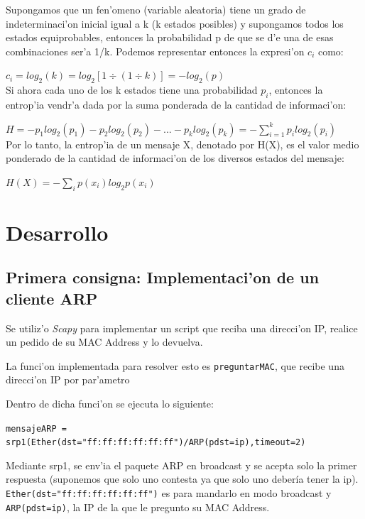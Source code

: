 \documentclass[a4paper,10pt]{article}
\begin{document}
Supongamos que un fen'omeno (variable aleatoria) tiene un grado de indeterminaci'on inicial igual a k (k estados posibles) y supongamos todos los estados equiprobables, entonces la probabilidad p de que se d'e una de esas combinaciones ser'a 1/k. Podemos representar entonces la expresi'on  $c_{i}$ como:

\vspace*{5 mm}
$c_{i} = log_{2}(k) = log_{2}\left[ 1 \div (1 \div k)\right] = -log_{2}(p)$
\\

Si ahora cada uno de los k estados tiene una probabilidad $p_{i}$, entonces la entrop'ia vendr'a dada por la suma ponderada de la cantidad de informaci'on:

\vspace*{5 mm}
$H = -p_{1}log_{2}(p_{1}) - p_{2}log_{2}(p_{2}) - ... -p_{k}log_{2}(p_{k}) = -\sum^{k}_{i=1} p_{i}log_{2}(p_{i})$
\\

Por lo tanto, la entrop'ia de un mensaje X, denotado por H(X), es el valor medio ponderado de la cantidad de informaci'on de los diversos estados del mensaje:

\vspace*{5 mm}
$H(X) = -\sum_{i} p(x_{i})log_{2}p(x_{i})$
\\

\section{Desarrollo}
\label{desarrollo1:}
\subsection{Primera consigna: Implementaci'on de un cliente ARP}
\label{expli1:}

Se utiliz'o \textit{Scapy} para implementar un script que reciba una direcci'on IP, realice un pedido de su MAC Address y lo devuelva.

La funci'on implementada para resolver esto es \texttt{preguntarMAC}, que recibe una direcci'on IP por par'ametro

Dentro de dicha funci'on se ejecuta lo siguiente:

\vspace*{5 mm}
\texttt{mensajeARP = srp1(Ether(dst="ff:ff:ff:ff:ff:ff")/ARP(pdst=ip),timeout=2)}
\vspace*{5 mm}

Mediante srp1, se env'ia el paquete ARP en broadcast y se acepta solo la primer respuesta (suponemos que solo uno contesta ya que solo uno debería tener la ip). \texttt{Ether(dst="ff:ff:ff:ff:ff:ff")} es para mandarlo en modo broadcast y \texttt{ARP(pdst=ip)}, la IP de la que le pregunto su MAC Address.
\end{document}
